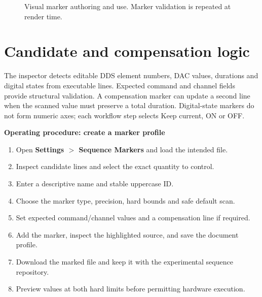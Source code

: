 \documentclass[11pt,oneside,openany]{book}
\newcommand{\code}[1]{\texttt{\detokenize{#1}}}
\newcommand{\ui}[1]{\textbf{#1}}
\newenvironment{procedure}[1]
  {\par\medskip\noindent\textbf{Operating procedure: #1}\par\smallskip\begin{enumerate}}
  {\end{enumerate}\medskip}
\begin{document}
\begin{figure}[htbp]
\centering
{}
\caption{Visual marker authoring and use. Marker validation is repeated at render time.}
\label{fig:marker-authoring}
\end{figure}

\section{Candidate and compensation logic}
The inspector detects editable DDS element numbers, DAC values, durations and digital
states from executable lines. Expected command and channel fields provide structural
validation. A compensation marker can update a second line when the scanned value must
preserve a total duration. Digital-state markers do not form numeric axes; each workflow
step selects Keep current, ON or OFF.

\begin{procedure}{create a marker profile}
  \item Open \ui{Settings $>$ Sequence Markers} and load the intended \code{.mot} file.
  \item Inspect candidate lines and select the exact quantity to control.
  \item Enter a descriptive name and stable uppercase ID.
  \item Choose the marker type, precision, hard bounds and safe default scan.
  \item Set expected command/channel values and a compensation line if required.
  \item Add the marker, inspect the highlighted source, and save the document profile.
  \item Download the marked file and keep it with the experimental sequence repository.
  \item Preview values at both hard limits before permitting hardware execution.
\end{procedure}
\end{document}

